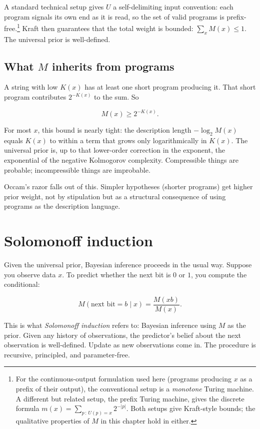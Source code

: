 A standard technical setup gives $U$ a self-delimiting input convention: each program signals its own end as it is read, so the set of valid programs is prefix-free.\footnote{For the continuous-output formulation used here (programs producing $x$ as a prefix of their output), the conventional setup is a \emph{monotone} Turing machine. A different but related setup, the prefix Turing machine, gives the discrete formula $m(x) = \sum_{p\,:\,U(p)=x} 2^{-|p|}$. Both setups give Kraft-style bounds; the qualitative properties of $M$ in this chapter hold in either.} Kraft then guarantees that the total weight is bounded: $\sum_x M(x) \leq 1$. The universal prior is well-defined.

\subsection*{What $M$ inherits from programs}

A string with low $K(x)$ has at least one short program producing it. That short program contributes $2^{-K(x)}$ to the sum. So

$$M(x) \geq 2^{-K(x)}.$$

For most $x$, this bound is nearly tight: the description length $-\log_2 M(x)$ equals $K(x)$ to within a term that grows only logarithmically in $K(x)$. The universal prior is, up to that lower-order correction in the exponent, the exponential of the negative Kolmogorov complexity. Compressible things are probable; incompressible things are improbable.

Occam's razor falls out of this. Simpler hypotheses (shorter programs) get higher prior weight, not by stipulation but as a structural consequence of using programs as the description language.

\section*{Solomonoff induction}

Given the universal prior, Bayesian inference proceeds in the usual way. Suppose you observe data $x$. To predict whether the next bit is $0$ or $1$, you compute the conditional:

$$M(\text{next bit} = b \mid x) = \frac{M(xb)}{M(x)}.$$

This is what \emph{Solomonoff induction} refers to: Bayesian inference using $M$ as the prior. Given any history of observations, the predictor's belief about the next observation is well-defined. Update as new observations come in. The procedure is recursive, principled, and parameter-free.

